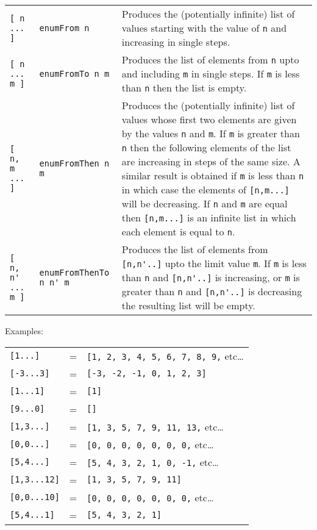 \begin{tabular}{llp{6cm}}
    \verb"[ n ... ]"&         \verb"enumFrom n" &
                     Produces the (potentially infinite) list of values
                     starting with the value of  \verb"n" and  increasing  in
                     single steps.\\
    \verb"[ n ... m ]"&       \verb"enumFromTo n m"&
                     Produces the list of  elements  from  \verb"n" upto  and
                     including \verb"m" in single steps.
                     If \verb"m" is less than \verb"n"
                     then the list is empty.\\
    \verb"[ n, m ... ]"&      \verb"enumFromThen n m"&
                     Produces the (potentially infinite) list of values
                     whose first two elements are given by the values \verb"n"
                     and \verb"m".  If \verb"m"
                     is greater than \verb"n" then the  following
                     elements of the list are increasing  in  steps  of
                     the same size.  A similar result is obtained if  \verb"m"
                     is less than \verb"n" in  which  case  the  elements  of
                     \verb"[n,m...]" will be decreasing.  
                     If \verb"n" and \verb"m" are  equal
                     then \verb"[n,m...]" is an infinite  list  in  which  each
                     element is equal to \verb"n".\\
    \verb"[ n, n' ... m ]"&   \verb"enumFromThenTo n n' m"&
                     Produces the list of elements from  \verb"[n,n'..]" upto
                     the limit value \verb"m".
                     If  \verb"m" is  less  than  \verb"n" and
                     \verb"[n,n'..]" is increasing, or \verb"m"
                     is greater than \verb"n" and
                     \verb"[n,n'..]" is decreasing the resulting list will be
                     empty.
\end{tabular}
\EQ
Examples:
\BQ
\begin{tabular}{lcl}
    {\tt [1...]    }& = & {\tt [1, 2, 3, 4, 5, 6, 7, 8, 9,} etc\dots\\
    {\tt [-3...3]  }& = & {\tt [-3, -2, -1, 0, 1, 2, 3]}\\
    {\tt [1...1]   }& = & {\tt [1]}\\
    {\tt [9...0]   }& = & {\tt []}\\
    {\tt [1,3...]  }& = & {\tt [1, 3, 5, 7, 9, 11, 13,} etc\dots\\
    {\tt [0,0...]  }& = & {\tt [0, 0, 0, 0, 0, 0, 0,} etc\dots\\
    {\tt [5,4...]  }& = & {\tt [5, 4, 3, 2, 1, 0, -1,} etc\dots\\
    {\tt [1,3...12]}& = & {\tt [1, 3, 5, 7, 9, 11]}\\
    {\tt [0,0...10]}& = & {\tt [0, 0, 0, 0, 0, 0, 0,} etc\dots\\
    {\tt [5,4...1] }& = & {\tt [5, 4, 3, 2, 1]}
\end{tabular}
